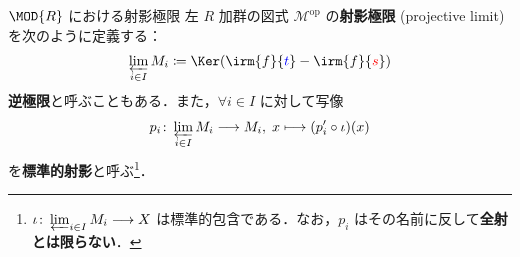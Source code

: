\documentclass[algtopo_main]{subfiles}
\begin{document}
\begin{mydef}[label=def:projlim]{$\MOD{R}$ における射影極限}
	左 $R$ 加群の図式 $\mathcal{M}^{\mathrm{op}}$ の\textbf{射影極限} (projective limit) を次のように定義する：
	\begin{align}
		\varprojlim_{i \in I} M_i \coloneqq \Ker (\irm{f}{\textcolor{blue}{t}} - \irm{f}{\textcolor{red}{s}})
	\end{align}
	\textbf{逆極限}と呼ぶこともある．また，$\forall i \in I$ に対して写像
	\begin{align}
		p_i \colon \varprojlim_{i \in I} M_i \longrightarrow M_i,\; x \longmapsto (p'_i \circ \iota)(x)
	\end{align}
	を\textbf{標準的射影}と呼ぶ\footnote{$\iota \colon \varprojlim_{i \in I}M_i \longrightarrow X$ は標準的包含である．なお，$p_i$ はその名前に反して\textbf{全射とは限らない}．}．
\end{mydef}
\end{document}
